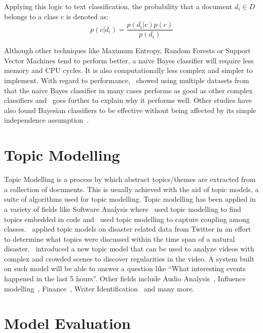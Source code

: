 Applying this logic to text classification, the probability that a document $d_i \in D$ belongs to a
class $c$ is denoted as:
\begin{equation}
  p(c|d_i) = \frac{p(d_i|c)p(c)}{p(d_i)}
\end{equation}

Although other techniques like Maximum Entropy, Random Forests or Support Vector Machines tend to
perform better, a naive Bayes classifier will require less memory and CPU cycles. It is also
computationally less complex and simpler to implement. With regard to
performance,~\cite{huangLuLing2003} showed using multiple datasets from~\cite{blakeMerz1998} that
the naive Bayes classifier in many cases performs as good as other complex classifiers
and~\cite{zhang2004} goes further to explain why it performs well. Other studies have also found
Bayesian classifiers to be effective without being affected by its simple independence
assumption~\cite{langley1992analysis,manning2008}.

\section{Topic Modelling}
\label{sec:bg_topic_modelling}
Topic Modelling is a process by which abstract topics/themes are extracted from a collection of
documents. This is usually achieved with the aid of topic models, a suite of algorithms used for
topic modelling. Topic modelling has been applied in a variety of fields like Software Analysis
where~\cite{linstead2009software} used topic modelling to find topics embedded in code
and~\cite{gethers2010using} used topic modelling to capture coupling among
classes.~\cite{kireyev2009applications} applied topic models on disaster related data from Twitter
in an effort to determine what topics were discussed within the time span of a natural
disaster.~\cite{hospedales2009markov} introduced a new topic model that can be used to analyze
videos with complex and crowded scenes to discover regularities in the video. A system built on such
model will be able to answer a question like ``What interesting events happened in the last 5
hours''. Other fields include Audio Analysis~\cite{smaragdis2009topic}, Influence
modelling~\cite{gerrish2009modeling}, Finance~\cite{doyle2009financial}, Writer
Identification~\cite{bhardwaj2009writer} and many more.




\section{Model Evaluation}
\label{sec:bg_model_evaluation}


